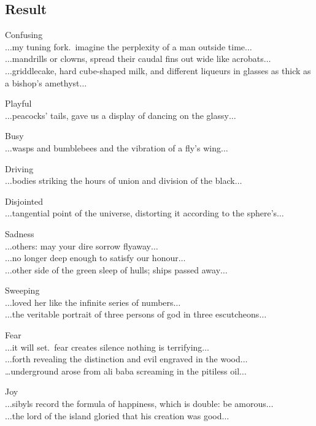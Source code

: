 \subsection{Result}

Confusing\\
$\ldots$my tuning fork.\ imagine the perplexity of a man outside time$\ldots$\\
$\ldots$mandrills or clowns, spread their caudal fins out wide like acrobats$\ldots$\\
$\ldots$griddlecake, hard cube-shaped milk, and different liqueurs in glasses as thick as a bishop's amethyst$\ldots$

Playful\\
$\ldots$peacocks' tails, gave us a display of dancing on the glassy$\ldots$

Busy\\
$\ldots$wasps and bumblebees and the vibration of a fly's wing$\ldots$

Driving\\
$\ldots$bodies striking the hours of union and division of the black$\ldots$

Disjointed\\
$\ldots$tangential point of the universe, distorting it according to the sphere's$\ldots$

Sadness\\
$\ldots$others: may your dire sorrow flyaway$\ldots$\\
$\ldots$no longer deep enough to satisfy our honour$\ldots$\\
$\ldots$other side of the green sleep of hulls; ships passed away$\ldots$

Sweeping\\
$\ldots$loved her like the infinite series of numbers$\ldots$\\
$\ldots$the veritable portrait of three persons of god in three escutcheons$\ldots$

Fear\\
$\ldots$it will set.\ fear creates silence nothing is terrifying$\ldots$\\
$\ldots$forth revealing the distinction and evil engraved in the wood$\ldots$\\
…underground arose from ali baba screaming in the pitiless oil$\ldots$

Joy\\
$\ldots$sibyls record the formula of happiness, which is double: be amorous$\ldots$\\
$\ldots$the lord of the island gloried that his creation was good$\ldots$

